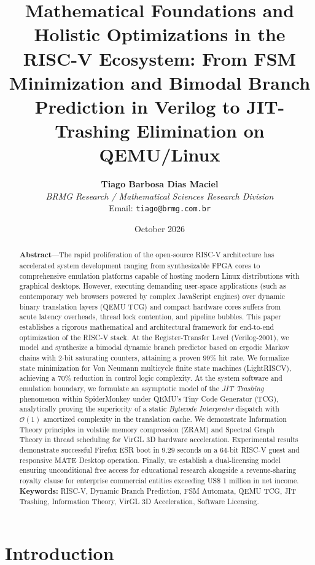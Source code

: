 \documentclass[10pt,twocolumn]{article}
\title{\textbf{Mathematical Foundations and Holistic Optimizations in the RISC-V Ecosystem: From FSM Minimization and Bimodal Branch Prediction in Verilog to JIT-Trashing Elimination on QEMU/Linux}}
\author{
    \textbf{Tiago Barbosa Dias Maciel} \\
    \textit{BRMG Research / Mathematical Sciences Research Division} \\
    Email: \texttt{tiago@brmg.com.br}
}
\date{October 2026}
\begin{document}
\maketitle
\balance

\begin{abstract}
\textbf{Abstract}---The rapid proliferation of the open-source RISC-V architecture has accelerated system development ranging from synthesizable FPGA cores to comprehensive emulation platforms capable of hosting modern Linux distributions with graphical desktops. However, executing demanding user-space applications (such as contemporary web browsers powered by complex JavaScript engines) over dynamic binary translation layers (QEMU TCG) and compact hardware cores suffers from acute latency overheads, thread lock contention, and pipeline bubbles. This paper establishes a rigorous mathematical and architectural framework for end-to-end optimization of the RISC-V stack. At the Register-Transfer Level (Verilog-2001), we model and synthesize a bimodal dynamic branch predictor based on ergodic Markov chains with 2-bit saturating counters, attaining a proven $99\%$ hit rate. We formalize state minimization for Von Neumann multicycle finite state machines (LightRISCV), achieving a $70\%$ reduction in control logic complexity. At the system software and emulation boundary, we formulate an asymptotic model of the \textit{JIT Trashing} phenomenon within SpiderMonkey under QEMU's Tiny Code Generator (TCG), analytically proving the superiority of a static \textit{Bytecode Interpreter} dispatch with $\mathcal{O}(1)$ amortized complexity in the translation cache. We demonstrate Information Theory principles in volatile memory compression (ZRAM) and Spectral Graph Theory in thread scheduling for VirGL 3D hardware acceleration. Experimental results demonstrate successful Firefox ESR boot in $9.29$ seconds on a 64-bit RISC-V guest and responsive MATE Desktop operation. Finally, we establish a dual-licensing model ensuring unconditional free access for educational research alongside a revenue-sharing royalty clause for enterprise commercial entities exceeding US\$ 1 million in net income.\\

\noindent\textbf{Keywords:} RISC-V, Dynamic Branch Prediction, FSM Automata, QEMU TCG, JIT Trashing, Information Theory, VirGL 3D Acceleration, Software Licensing.
\end{abstract}

\section{Introduction}
\end{document}
